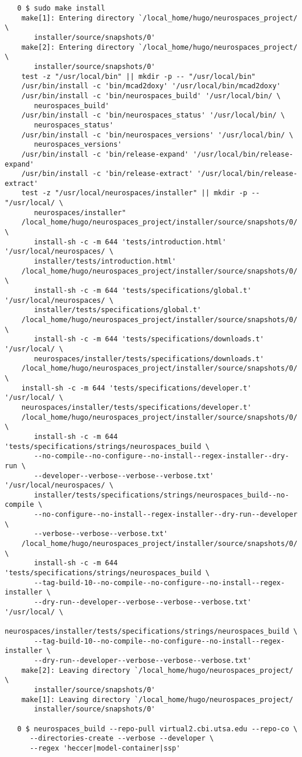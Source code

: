 \documentclass[12pt]{article}
\begin{document}
\begin{verbatim}
   0 $ sudo make install
    make[1]: Entering directory `/local_home/hugo/neurospaces_project/ \
       installer/source/snapshots/0'
    make[2]: Entering directory `/local_home/hugo/neurospaces_project/ \
       installer/source/snapshots/0'
    test -z "/usr/local/bin" || mkdir -p -- "/usr/local/bin"
    /usr/bin/install -c 'bin/mcad2doxy' '/usr/local/bin/mcad2doxy'
    /usr/bin/install -c 'bin/neurospaces_build' '/usr/local/bin/ \
       neurospaces_build'
    /usr/bin/install -c 'bin/neurospaces_status' '/usr/local/bin/ \
       neurospaces_status'
    /usr/bin/install -c 'bin/neurospaces_versions' '/usr/local/bin/ \
       neurospaces_versions'
    /usr/bin/install -c 'bin/release-expand' '/usr/local/bin/release-expand'
    /usr/bin/install -c 'bin/release-extract' '/usr/local/bin/release-extract'
    test -z "/usr/local/neurospaces/installer" || mkdir -p -- "/usr/local/ \
       neurospaces/installer"
    /local_home/hugo/neurospaces_project/installer/source/snapshots/0/ \
       install-sh -c -m 644 'tests/introduction.html' '/usr/local/neurospaces/ \
       installer/tests/introduction.html'
    /local_home/hugo/neurospaces_project/installer/source/snapshots/0/ \
       install-sh -c -m 644 'tests/specifications/global.t' '/usr/local/neurospaces/ \
       installer/tests/specifications/global.t'
    /local_home/hugo/neurospaces_project/installer/source/snapshots/0/ \
       install-sh -c -m 644 'tests/specifications/downloads.t' '/usr/local/ \
       neurospaces/installer/tests/specifications/downloads.t'
    /local_home/hugo/neurospaces_project/installer/source/snapshots/0/ \
    install-sh -c -m 644 'tests/specifications/developer.t' '/usr/local/ \
    neurospaces/installer/tests/specifications/developer.t'
    /local_home/hugo/neurospaces_project/installer/source/snapshots/0/ \
       install-sh -c -m 644 'tests/specifications/strings/neurospaces_build \
       --no-compile--no-configure--no-install--regex-installer--dry-run \
       --developer--verbose--verbose--verbose.txt' '/usr/local/neurospaces/ \
       installer/tests/specifications/strings/neurospaces_build--no-compile \
       --no-configure--no-install--regex-installer--dry-run--developer \
       --verbose--verbose--verbose.txt'
    /local_home/hugo/neurospaces_project/installer/source/snapshots/0/ \
       install-sh -c -m 644 'tests/specifications/strings/neurospaces_build \
       --tag-build-10--no-compile--no-configure--no-install--regex-installer \
       --dry-run--developer--verbose--verbose--verbose.txt' '/usr/local/ \
       neurospaces/installer/tests/specifications/strings/neurospaces_build \
       --tag-build-10--no-compile--no-configure--no-install--regex-installer \
       --dry-run--developer--verbose--verbose--verbose.txt'
    make[2]: Leaving directory `/local_home/hugo/neurospaces_project/ \
       installer/source/snapshots/0'
    make[1]: Leaving directory `/local_home/hugo/neurospaces_project/ 
       installer/source/snapshots/0'

   0 $ neurospaces_build --repo-pull virtual2.cbi.utsa.edu --repo-co \
      --directories-create --verbose --developer \
      --regex 'heccer|model-container|ssp'
   
\end{verbatim}
\end{document}
